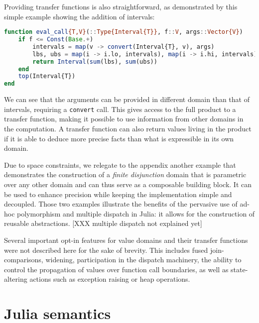 \documentclass[11pt]{article}
\begin{document}
Providing transfer functions is also straightforward, as demonstrated by this simple example showing the addition of intervals:
\begin{singlespace}
\begin{lstlisting}[language=julia]
function eval_call{T,V}(::Type{Interval{T}}, f::V, args::Vector{V})
    if f <= Const(Base.+)
        intervals = map(v -> convert(Interval{T}, v), args)
        lbs, ubs = map(i -> i.lo, intervals), map(i -> i.hi, intervals)
        return Interval(sum(lbs), sum(ubs))
    end
    top(Interval{T})
end
\end{lstlisting}
\end{singlespace}
We can see that the arguments can be provided in different domain than that of intervals, requiring a \verb~convert~ call. This gives access to the full product to a transfer function, making it possible to use information from other domains in the computation. A transfer function can also return values living in the product if it is able to deduce more precise facts than what is expressible in its own domain.

Due to space constraints, we relegate to the appendix another example that demonstrates the construction of a \emph{finite disjunction} domain that is parametric over any other domain and can thus serve as a composable building block. It can be used to enhance precision while keeping the implementation simple and decoupled.
Those two examples illustrate the benefits of the pervasive use of ad-hoc polymorphism and multiple dispatch in Julia: it allows for the construction of reusable abstractions. [XXX multiple dispatch not explained yet]

Several important opt-in features for value domains and their transfer functions were not described here for the sake of brevity. This includes fused join-comparisons, widening, participation in the dispatch machinery, the ability to control the propagation of values over function call boundaries, as well as state-altering actions such as exception raising or heap operations.

\section*{Julia semantics}
\end{document}
